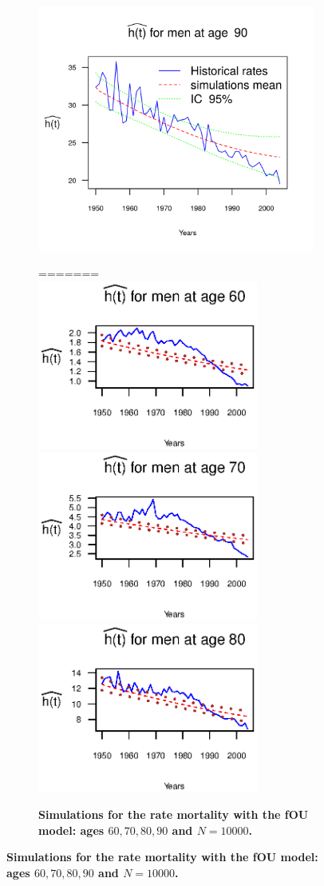 \documentclass[smallextended]{svjour3}
\begin{document}
\begin{figure}[H]
\begin{figure}[H]
    \includegraphics{PlotMen90.png}
    \caption{\bf Simulations for the rate mortality with the fOU model: ages
    $60,70,80,90$ and $N=10000$.}
=======
    \includegraphics[width = 2.85in]{PlotMen60.eps}
    \includegraphics[width = 2.85in]{PlotMen70.eps}
    \includegraphics[width = 2.85in]{PlotMen80.eps}

\end{figure}
\end{figure}
\end{document}
